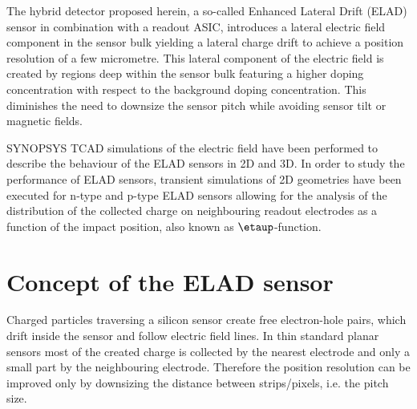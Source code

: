 \documentclass[a4paper,11pt]{article}
\begin{document}
The hybrid detector proposed herein, a so-called Enhanced Lateral Drift (ELAD) sensor in combination with a readout ASIC,
 introduces a lateral electric field component in the sensor bulk yielding a lateral charge drift to achieve a position resolution of a few micrometre. 
This lateral component of the electric field is created by regions deep within the sensor bulk featuring a higher doping concentration with respect to the background doping concentration.
This diminishes the need to downsize the sensor pitch while avoiding sensor tilt or magnetic fields. 

SYNOPSYS TCAD simulations of the electric field have been performed to describe the behaviour of the ELAD sensors in 2D and 3D.
In order to study the performance of ELAD sensors, transient simulations of 2D geometries have been executed for n-type and p-type ELAD sensors
 allowing for the analysis of the distribution of the collected charge on neighbouring readout electrodes as a function of the impact position, also known as $\etaup$-function.

 
\section{Concept of the ELAD sensor}
\label{sec:con}
Charged particles traversing a silicon sensor create free electron-hole pairs, which drift inside the sensor and follow electric field lines.
In thin standard planar sensors most of the created charge is collected by the nearest electrode and only a small part by the neighbouring electrode.
Therefore the position resolution can be improved only by downsizing the distance between strips/pixels, i.e. the pitch size.
\end{document}
